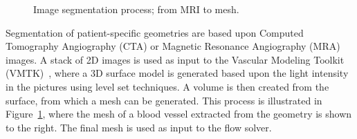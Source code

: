 \begin{figure} \label{fig:kvs-2:imagseg}
  \begin{center}
    \caption{Image segmentation process; from MRI to mesh.}
  \end{center}
\end{figure}

Segmentation of patient-specific geometries are based upon Computed
Tomography Angiography (CTA) or Magnetic Resonance Angiography (MRA)
images. A stack of 2D images is used as input to the Vascular Modeling
Toolkit (VMTK)~\citep{vmtk}, where a 3D surface model is generated
based upon the light intensity in the pictures using
level set techniques. A volume is then created from the surface, from
which a mesh can be generated. This process is illustrated in
Figure~\ref{fig:kvs-2:imagseg}, where the mesh of a blood vessel
extracted from the geometry is shown to the right. The final mesh is
used as input to the flow solver.

